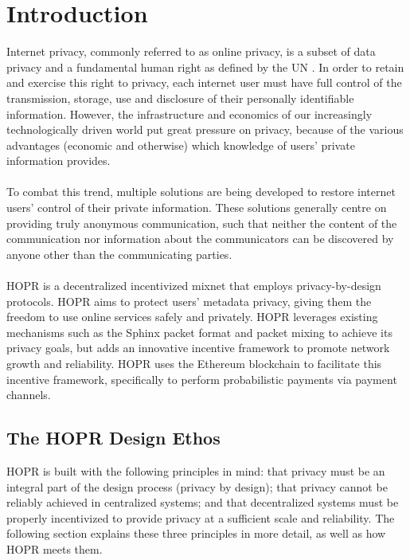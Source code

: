 
\section{Introduction}
\label{sec:introduction}

Internet privacy, commonly referred to as online privacy, is a subset of
data privacy and a fundamental human right as defined by the UN \cite{un2018}.
In order to retain and exercise this right to privacy, each internet user must have full control of the transmission, storage, use and disclosure of their
personally identifiable information. However, the infrastructure and economics of our increasingly technologically driven world put great pressure on privacy, because of the various advantages (economic and otherwise) which knowledge of users' private information provides. 
\\~\\To combat this trend, multiple solutions are being developed to restore internet users' control of their private information. These solutions generally centre on providing truly anonymous communication, such that neither the content of the communication nor information about the communicators can be discovered by anyone other than the communicating parties.
\\~\\HOPR is a decentralized incentivized mixnet that employs privacy-by-design protocols. HOPR aims to protect users' metadata privacy, giving them the
freedom to use online services safely and privately. HOPR leverages existing mechanisms such as the Sphinx packet format
\cite{sphinxpaper} and packet mixing to achieve its privacy goals, but adds an innovative incentive framework to promote network growth and reliability. HOPR uses the
Ethereum blockchain \cite{ethereum} to facilitate this incentive framework, specifically to perform probabilistic payments via payment channels. 


\subsection{The HOPR Design Ethos}
\label{sec:vision}

HOPR is built with the following principles in mind: that privacy must be an integral part of the design process (privacy by design); that privacy cannot be reliably achieved in centralized systems; and that decentralized systems must be properly incentivized to provide privacy at a sufficient scale and reliability. The following section explains these three principles in more detail, as well as how HOPR meets them.


